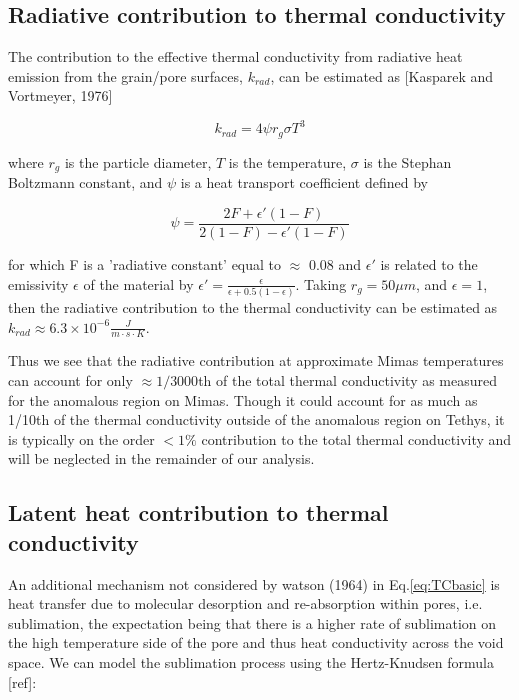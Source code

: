 \documentclass[11pt]{article} %
\begin{document}

\subsection{Radiative contribution to thermal conductivity}

	The contribution to the effective thermal conductivity from radiative heat emission from the grain/pore surfaces, $k_{rad}$, can be estimated as [Kasparek and Vortmeyer, 1976]

	\begin{equation}
	k_{rad} = 4 \psi r_{g} \sigma T^{3}
	\end{equation}
	
	where $r_{g}$ is the particle diameter, $T$ is the temperature, $\sigma$ is the Stephan Boltzmann constant, and $\psi$ is a heat transport coefficient defined by
	
	\begin{equation}
	\psi = \frac{2F + \epsilon'(1-F)}{2(1-F)-\epsilon'(1-F)}
	\end{equation}

	for which F is a 'radiative constant' equal to $\approx$ 0.08 and $\epsilon'$ is related to the emissivity $\epsilon$ of the material by $\epsilon' = \frac{\epsilon}{\epsilon +0.5(1-\epsilon)}$. Taking $r_{g} = 50 \mu m$, and $\epsilon = 1$, then the radiative contribution to the thermal conductivity can be estimated as $k_{rad} \approx 6.3\times10^{-6} \frac{J}{m \cdot s \cdot K}$.
	
	Thus we see that the radiative contribution at approximate Mimas temperatures can account for only $\approx 1/3000$th of the total thermal conductivity as measured for the anomalous region on Mimas. Though it could account for as much as 1/10th of the thermal conductivity outside of the anomalous region on Tethys, it is typically on the order $<1\%$ contribution to the total thermal conductivity and will be neglected in the remainder of our analysis.

\subsection{Latent heat contribution to thermal conductivity}
	An additional mechanism not considered by watson (1964) in Eq.\ref{eq:TCbasic} is heat transfer due to molecular desorption and re-absorption within pores, i.e. sublimation, the expectation being that there is a higher rate of sublimation on the high temperature side of the pore and thus heat conductivity across the void space. We can model the sublimation process using the Hertz-Knudsen formula [ref]:
\end{document}
